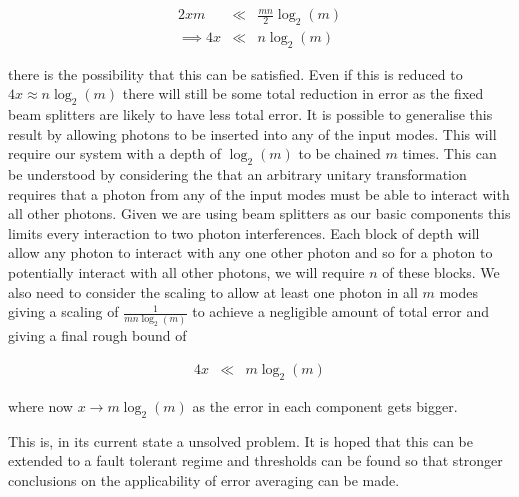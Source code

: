 \documentclass[aps,pra,twocolumn,superscriptaddress,numerical]{revtex4-1}
\begin{document}
		\begin{eqnarray}
			2xm & \ll & \frac{mn}{2}\log_{2}\left(m\right)\nonumber \\
			\implies4x & \ll & n\log_{2}\left(m\right)\label{eq:aBetterInequality}
		\end{eqnarray}
		
		
		there is the possibility that this can be satisfied. Even if this is reduced to $4x\approx n\log_{2}\left(m\right)$ there will still be some total reduction in error as the fixed beam splitters are likely to have less total error. It is possible to generalise this result by allowing photons to be inserted into any of the input modes. This	will require our system with a depth of $\log_{2}\left(m\right)$ to be chained $m$  times. This can be understood by considering the that an arbitrary unitary transformation requires that a photon from any of the  input modes must be able to interact with all other photons. Given we are using beam splitters as our basic components this limits every interaction to two photon interferences. Each block of depth  will allow any photon to interact with any one other photon and so for a photon to potentially interact with all other photons, we will require $n$ of these blocks. We also need to consider the scaling to allow at least one photon in all $m$ modes giving a scaling of $\frac{1}{mn\log_{2}\left(m\right)}$ to achieve a negligible amount of total error and giving a final rough bound of
			
		\begin{eqnarray}
			4x & \ll & m\log_{2}\left(m\right)\label{eq:aDifferentInequality}
		\end{eqnarray}
		
		
		where now $x\rightarrow m\log_{2}\left(m\right)$ as the error in each component gets bigger.
		
		This is, in its current state a unsolved problem. It is hoped that this can be extended to a fault tolerant regime and thresholds can be found so that stronger conclusions on the applicability of error averaging can be made.
\end{document}
